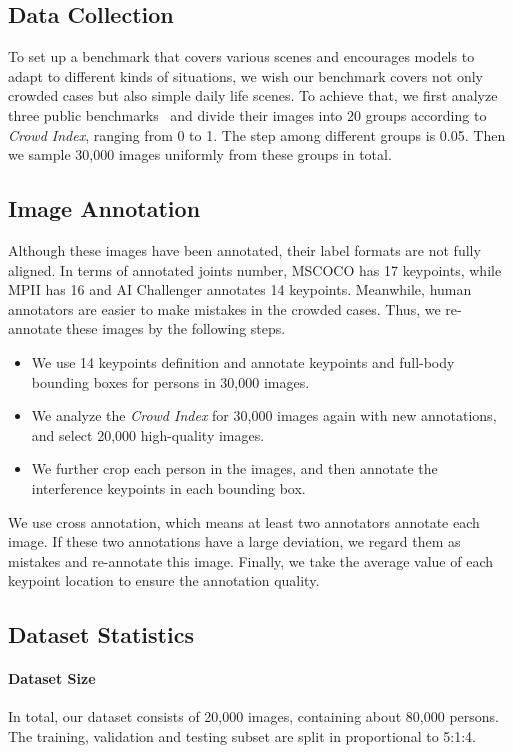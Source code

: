 \documentclass[10pt,twocolumn,letterpaper]{article}
\begin{document}
\subsection{Data Collection}
To set up a benchmark that covers various scenes and encourages models to adapt to different kinds of situations, we wish our benchmark covers not only crowded cases but also simple daily life scenes. To achieve that, we first analyze three public benchmarks~\cite{mscoco, mpii, aic} and divide their images into 20 groups according to \textit{Crowd Index}, ranging from 0 to 1. The step among different groups is 0.05. Then we sample 30,000 images uniformly from these groups in total.

\subsection{Image Annotation}
Although these images have been annotated, their label formats are not fully aligned. In terms of annotated joints number, MSCOCO has 17 keypoints, while MPII has 16 and AI Challenger annotates 14 keypoints. Meanwhile, human annotators are easier to make mistakes in the crowded cases. Thus, we re-annotate these images by the following steps.
\begin{itemize}
    \item We use 14 keypoints definition and annotate keypoints and full-body bounding boxes for persons in 30,000 images.
    \item We analyze the \textit{Crowd Index} for 30,000 images again with new annotations, and select 20,000 high-quality images.
    \item We further crop each person in the images, and then annotate the interference keypoints in each bounding box.
\end{itemize}

We use cross annotation, which means at least two annotators annotate each image. If these two annotations have a large deviation, we regard them as mistakes and re-annotate this image. Finally, we take the average value of each keypoint location to ensure the annotation quality.

\subsection{Dataset Statistics}
\paragraph{Dataset Size} In total, our dataset consists of 20,000 images, containing about 80,000 persons. The training, validation and testing subset are split in proportional to 5:1:4.
\end{document}

